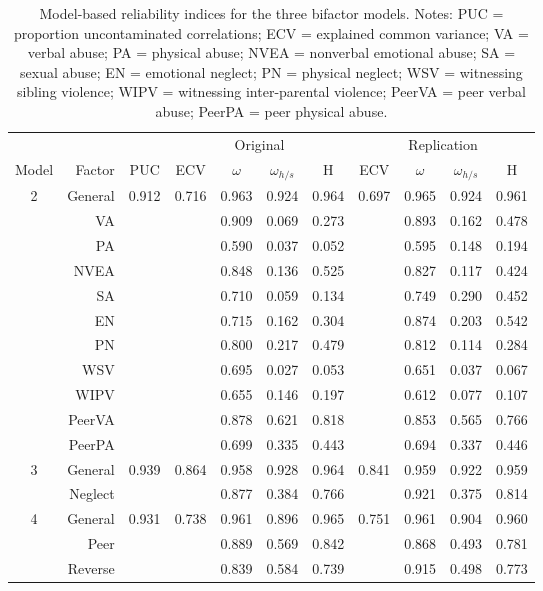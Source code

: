 \documentclass[letterpaper,man,natbib,floatsintext,longtable]{apa6}
\begin{document}
\begin{table}[h!]
\centering
\begin{tabular*}{\textwidth}{crccccccccc}
\toprule
& & & \multicolumn{4}{c}{Original} & \multicolumn{4}{c}{Replication} \\
\cmidrule(lr){4-7}\cmidrule(lr){8-11}
Model & Factor & PUC & ECV & $\omega$ & $\omega_{h/s}$ & H & ECV & $\omega$ & $\omega_{h/s}$ & H \\
\midrule
2 & General &  0.912 & 0.716 &  0.963 &   0.924 &  0.964 & 0.697 & 0.965 & 0.924 & 0.961 \\
& VA        &        &       &  0.909 &   0.069 &  0.273 &       & 0.893 & 0.162 & 0.478 \\
& PA        &        &       &  0.590 &   0.037 &  0.052 &       & 0.595 & 0.148 & 0.194 \\
& NVEA      &        &       &  0.848 &   0.136 &  0.525 &       & 0.827 & 0.117 & 0.424 \\
& SA        &        &       &  0.710 &   0.059 &  0.134 &       & 0.749 & 0.290 & 0.452 \\
& EN        &        &       &  0.715 &   0.162 &  0.304 &       & 0.874 & 0.203 & 0.542 \\
& PN        &        &       &  0.800 &   0.217 &  0.479 &       & 0.812 & 0.114 & 0.284 \\
& WSV       &        &       &  0.695 &   0.027 &  0.053 &       & 0.651 & 0.037 & 0.067 \\
& WIPV      &        &       &  0.655 &   0.146 &  0.197 &       & 0.612 & 0.077 & 0.107 \\
& PeerVA    &        &       &  0.878 &   0.621 &  0.818 &       & 0.853 & 0.565 & 0.766 \\
& PeerPA    &        &       &  0.699 &   0.335 &  0.443 &       & 0.694 & 0.337 & 0.446 \\
\midrule
3 & General &  0.939 & 0.864 &  0.958 &   0.928 &  0.964 & 0.841 & 0.959 & 0.922 & 0.959 \\
& Neglect   &        &       &  0.877 &   0.384 &  0.766 &       & 0.921 & 0.375 & 0.814 \\
\midrule
4 & General &  0.931 & 0.738 &  0.961 &   0.896 &  0.965 & 0.751 & 0.961 & 0.904 & 0.960 \\
& Peer      &        &       &  0.889 &   0.569 &  0.842 &       & 0.868 & 0.493 & 0.781 \\
& Reverse   &        &       &  0.839 &   0.584 &  0.739 &       & 0.915 & 0.498 & 0.773 \\
\bottomrule
\end{tabular*}
\captionsetup{width=1.\textwidth}
\caption{\normalfont Model-based reliability indices for the three bifactor models. Notes: PUC = proportion uncontaminated correlations; ECV = explained common variance; VA = verbal abuse; PA = physical abuse; NVEA = nonverbal emotional abuse; SA = sexual abuse; EN = emotional neglect; PN = physical neglect; WSV = witnessing sibling violence; WIPV = witnessing inter-parental violence; PeerVA = peer verbal abuse; PeerPA = peer physical abuse.}
\label{table:reliability}
\end{table}
\end{document}

